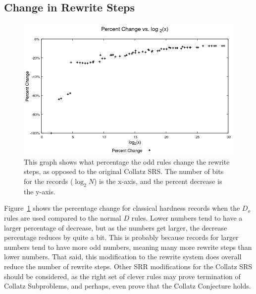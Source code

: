 \subsection{Change in Rewrite Steps}
\begin{figure}
    \centering
    \includegraphics[scale=0.75]{ModAvoidanceAnalysisPics/Percent_Change.png}
    \caption{This graph shows what percentage the odd rules change the rewrite steps, as opposed to the original Collatz SRS. The number of bits for the records ($\log_2{N}$) is the x-axis, and the percent decrease is the y-axis.}
    \label{fig:percent_decrease}
\end{figure}
Figure~\ref{fig:percent_decrease} shows the percentage change for classical hardness records when the $D_o$ rules are used compared to the normal $D$ rules. Lower numbers tend to have a larger percentage of decrease, but as the numbers get larger, the decrease percentage reduces by quite a bit. This is probably because records for larger numbers tend to have more odd numbers, meaning many more rewrite steps than lower numbers. That said, this modification to the rewrite system does overall reduce the number of rewrite steps. Other SRR modifications for the Collatz SRS should be considered, as the right set of clever rules may prove termination of Collatz Subproblems, and perhaps, even prove that the Collatz Conjecture holds.
